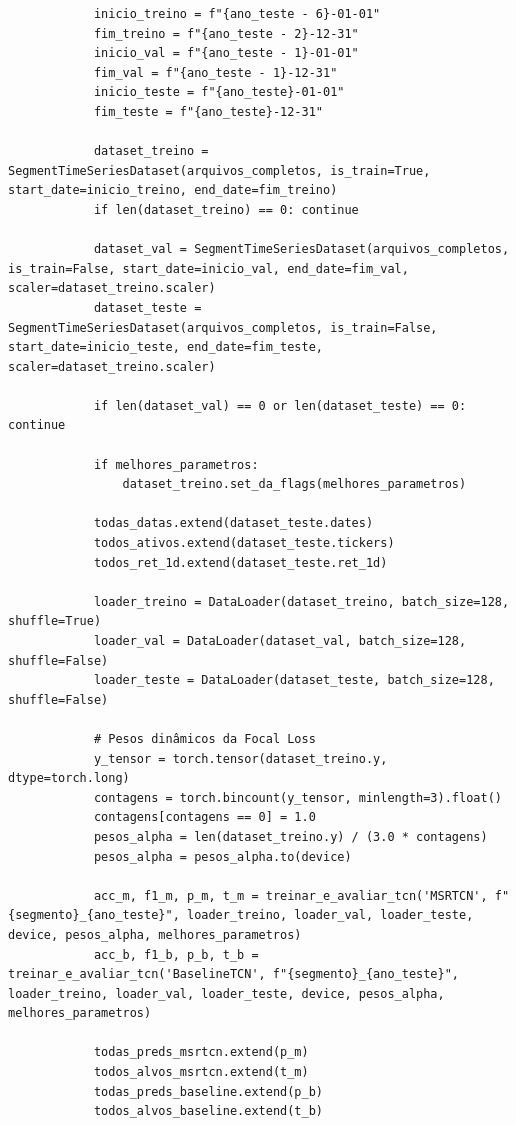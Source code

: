 \documentclass{article}
\begin{document}
\begin{verbatim}
            inicio_treino = f"{ano_teste - 6}-01-01"
            fim_treino = f"{ano_teste - 2}-12-31"
            inicio_val = f"{ano_teste - 1}-01-01"
            fim_val = f"{ano_teste - 1}-12-31"
            inicio_teste = f"{ano_teste}-01-01"
            fim_teste = f"{ano_teste}-12-31"
            
            dataset_treino = SegmentTimeSeriesDataset(arquivos_completos, is_train=True, start_date=inicio_treino, end_date=fim_treino)
            if len(dataset_treino) == 0: continue
                
            dataset_val = SegmentTimeSeriesDataset(arquivos_completos, is_train=False, start_date=inicio_val, end_date=fim_val, scaler=dataset_treino.scaler)
            dataset_teste = SegmentTimeSeriesDataset(arquivos_completos, is_train=False, start_date=inicio_teste, end_date=fim_teste, scaler=dataset_treino.scaler)
            
            if len(dataset_val) == 0 or len(dataset_teste) == 0: continue
                
            if melhores_parametros: 
                dataset_treino.set_da_flags(melhores_parametros)
                
            todas_datas.extend(dataset_teste.dates)
            todos_ativos.extend(dataset_teste.tickers)
            todos_ret_1d.extend(dataset_teste.ret_1d)
                
            loader_treino = DataLoader(dataset_treino, batch_size=128, shuffle=True)
            loader_val = DataLoader(dataset_val, batch_size=128, shuffle=False)
            loader_teste = DataLoader(dataset_teste, batch_size=128, shuffle=False)
            
            # Pesos dinâmicos da Focal Loss
            y_tensor = torch.tensor(dataset_treino.y, dtype=torch.long)
            contagens = torch.bincount(y_tensor, minlength=3).float()
            contagens[contagens == 0] = 1.0
            pesos_alpha = len(dataset_treino.y) / (3.0 * contagens)
            pesos_alpha = pesos_alpha.to(device)
            
            acc_m, f1_m, p_m, t_m = treinar_e_avaliar_tcn('MSRTCN', f"{segmento}_{ano_teste}", loader_treino, loader_val, loader_teste, device, pesos_alpha, melhores_parametros)
            acc_b, f1_b, p_b, t_b = treinar_e_avaliar_tcn('BaselineTCN', f"{segmento}_{ano_teste}", loader_treino, loader_val, loader_teste, device, pesos_alpha, melhores_parametros)
            
            todas_preds_msrtcn.extend(p_m)
            todos_alvos_msrtcn.extend(t_m)
            todas_preds_baseline.extend(p_b)
            todos_alvos_baseline.extend(t_b)
            

\end{verbatim}
\end{document}
